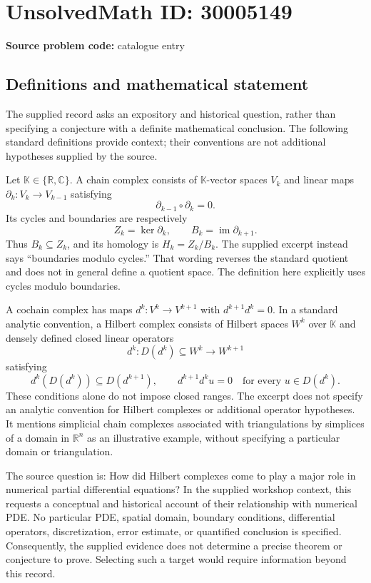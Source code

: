 \documentclass[11pt]{article}
\newcommand{\R}{\mathbb{R}}
\newcommand{\C}{\mathbb{C}}
\begin{document}
\section*{UnsolvedMath ID: 30005149}
\textbf{Source problem code:} catalogue entry
\subsection{Definitions and mathematical statement}
The supplied record asks an expository and historical question, rather than specifying a conjecture with a definite mathematical conclusion. The following standard definitions provide context; their conventions are not additional hypotheses supplied by the source.

Let \(\mathbb K\in\{\R,\C\}\). A chain complex consists of \(\mathbb K\)-vector spaces \(V_k\) and linear maps \(\partial_k:V_k\to V_{k-1}\) satisfying
\[
\partial_{k-1}\circ\partial_k=0.
\]
Its cycles and boundaries are respectively
\[
Z_k=\ker\partial_k,\qquad B_k=\operatorname{im}\partial_{k+1}.
\]
Thus \(B_k\subseteq Z_k\), and its homology is \(H_k=Z_k/B_k\). The supplied excerpt instead says ``boundaries modulo cycles.'' That wording reverses the standard quotient and does not in general define a quotient space. The definition here explicitly uses cycles modulo boundaries.

A cochain complex has maps \(d^k:V^k\to V^{k+1}\) with \(d^{k+1}d^k=0\). In a standard analytic convention, a Hilbert complex consists of Hilbert spaces \(W^k\) over \(\mathbb K\) and densely defined closed linear operators
\[
d^k:D(d^k)\subseteq W^k\longrightarrow W^{k+1}
\]
satisfying
\[
d^k(D(d^k))\subseteq D(d^{k+1}),\qquad d^{k+1}d^k u=0\quad\text{for every }u\in D(d^k).
\]
These conditions alone do not impose closed ranges. The excerpt does not specify an analytic convention for Hilbert complexes or additional operator hypotheses. It mentions simplicial chain complexes associated with triangulations by simplices of a domain in \(\R^n\) as an illustrative example, without specifying a particular domain or triangulation.

The source question is: How did Hilbert complexes come to play a major role in numerical partial differential equations? In the supplied workshop context, this requests a conceptual and historical account of their relationship with numerical PDE. No particular PDE, spatial domain, boundary conditions, differential operators, discretization, error estimate, or quantified conclusion is specified. Consequently, the supplied evidence does not determine a precise theorem or conjecture to prove. Selecting such a target would require information beyond this record.
\end{document}
